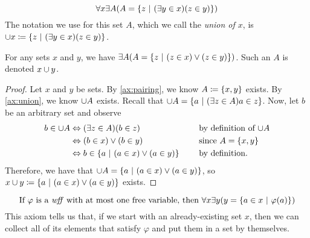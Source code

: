 \begin{axiom}[Union]\label{ax:union}
    \vspace{-\abovedisplayskip}
    \[
        \forall x \exists A \pn*{A = \set*{z \suchthat \pn*{\exists y \in x}\pn*{z \in y}}}
    \]
    The notation we use for this set \(A\), which we call the \emph{union of \(x\)},
    is \(\union x \defn \set*{z \suchthat \pn*{\exists y \in x}\pn*{z \in y}}\).
\end{axiom}

\begin{theorem}\label{thm:union}
    For any sets \(x\) and \(y\),
    we have \(\exists A \pn*{A = \set*{z \suchthat \pn*{z \in x} \join \pn*{z \in y}}}\).
    Such an \(A\) is denoted \(x \cup y\).
\end{theorem}
\begin{proof}
    Let \(x\) and \(y\) be sets.
    By \autoref{ax:pairing}, we know \(A \defn \set*{x, y}\) exists.
    By \autoref{ax:union}, we know \(\cup A\) exists.
    Recall that \(\union A = \set*{a \suchthat \pn*{\exists z \in A}{a \in z}}\).
    Now, let \(b\) be an arbitrary set and observe
    \begin{alignat*}{2}
        b \in \union A &\iff \pn*{\exists z \in A}\pn*{b \in z} &&\text{by definition of \(\union A\)} \\
                       &\iff (b \in x) \join (b \in y) &&\text{since \(A = \set*{x, y}\)} \\
                       &\iff b \in \set*{a \suchthat (a \in x) \join (a \in y)}~~~~&&\text{by definition}.
    \end{alignat*}
    Therefore, we have that \(\union A = \set*{a \suchthat (a \in x) \join (a \in y)}\),
    so \(x \union y \defn \set*{a \suchthat (a \in x) \join (a \in y)}\) exists.
\end{proof}

\begin{axiom}[Separation]\label{ax:separation}
    \vspace{-\abovedisplayskip}
    \[
        \text{If \(\varphi\) is a {\wff} with at most one free variable, then }
        \forall x \exists y \pn*{y = \set*{a \in x \suchthat \varphi(a)}}
    \]
    This axiom tells us that, if we start with an already-existing set \(x\),
    then we can collect all of its elements that satisfy \(\varphi\)
    and put them in a set by themselves.
\end{axiom}

